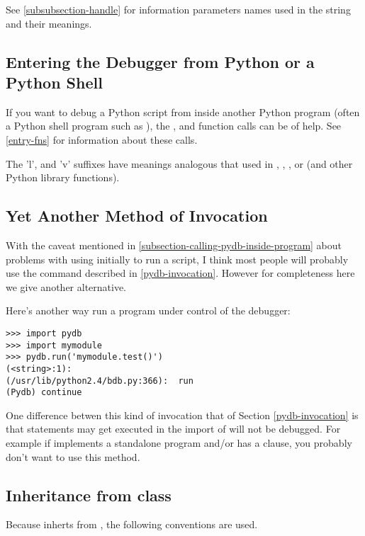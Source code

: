 See \ref{subsubsection-handle} for information parameters names used
in the string and their meanings.

\subsection{Entering the Debugger from Python or a Python
  Shell}\label{subsection-entering-pydb-from-python}

If you want to debug a Python script from inside another Python
program (often a Python shell program such as
), the 
, and  function calls can be of help. See
\ref{entry-fns} for information about these calls. 

The 'l', and 'v' suffixes have meanings analogous that used in
, , , or
 (and other Python library functions).

\subsection{Yet Another Method of Invocation}

With the caveat mentioned in
\ref{subsection-calling-pydb-inside-program} about problems with using
 initially to run a script, I think most people will
probably use the  command described in
\ref{pydb-invocation}. However for completeness here we give another
alternative.

Here's another way run a program under control of the debugger:

\begin{verbatim}
>>> import pydb
>>> import mymodule
>>> pydb.run('mymodule.test()')
(<string>:1): 
(/usr/lib/python2.4/bdb.py:366):  run
(Pydb) continue
\end{verbatim}

One difference betwen this kind of invocation that of Section
\ref{pydb-invocation} is that statements may get executed in the
import of  will not be debugged. For example if
 implements a standalone program and/or has a
 clause, you probably don't want to use
this method.


\subsection{Inheritance from class }
Because  inherts from , the following
conventions are used. 

